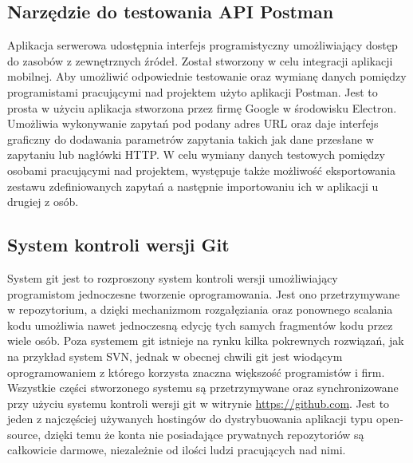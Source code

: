 \subsection{Narzędzie do testowania API Postman}

Aplikacja serwerowa udostępnia interfejs programistyczny umożliwiający dostęp do zasobów z zewnętrznych źródeł. Został stworzony w celu integracji aplikacji mobilnej. Aby umożliwić odpowiednie testowanie oraz wymianę danych pomiędzy programistami pracującymi nad projektem użyto aplikacji Postman. Jest to prosta w użyciu aplikacja stworzona przez firmę Google w środowisku Electron. Umożliwia wykonywanie zapytań pod podany adres URL oraz daje interfejs graficzny do dodawania parametrów zapytania takich jak dane przesłane w zapytaniu lub nagłówki HTTP. \newline
W celu wymiany danych testowych pomiędzy osobami pracującymi nad projektem, występuje także możliwość eksportowania zestawu zdefiniowanych zapytań a następnie importowaniu ich w aplikacji u drugiej z osób.

\subsection{System kontroli wersji Git}

System git jest to rozproszony system kontroli wersji umożliwiający programistom jednoczesne tworzenie oprogramowania. Jest ono przetrzymywane w repozytorium, a dzięki mechanizmom rozgałęziania oraz ponownego scalania kodu umożliwia nawet jednoczesną edycję tych samych fragmentów kodu  przez wiele osób. Poza systemem git istnieje na rynku kilka pokrewnych rozwiązań, jak na przykład system SVN, jednak w obecnej chwili git jest wiodącym oprogramowaniem z którego korzysta znaczna większość programistów i firm.\newline
Wszystkie części stworzonego systemu są przetrzymywane oraz synchronizowane przy użyciu systemu kontroli wersji git w witrynie \url{https://github.com}. Jest to jeden z najczęściej używanych hostingów do dystrybuowania aplikacji typu open-source, dzięki temu że konta nie posiadające prywatnych repozytoriów są całkowicie darmowe, niezależnie od ilości ludzi pracujących nad nimi.


